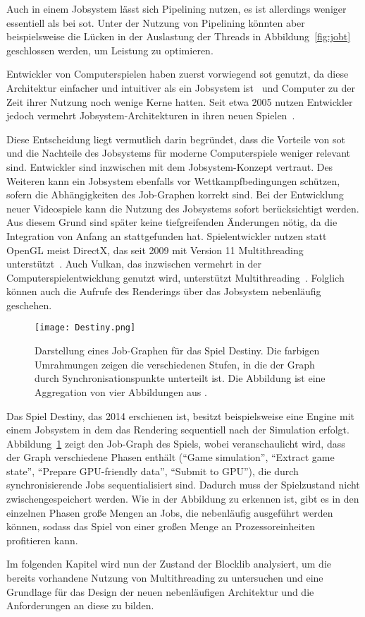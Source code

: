 Auch in einem Jobsystem lässt sich Pipelining nutzen, es ist allerdings weniger essentiell als bei \ac{sot}. Unter der Nutzung von Pipelining könnten aber beispielsweise die Lücken in der Auslastung der Threads in Abbildung~\vref{fig:jobt} geschlossen werden, um Leistung zu optimieren.

Entwickler von Computerspielen haben zuerst vorwiegend \ac{sot} genutzt, da diese Architektur einfacher und intuitiver als ein Jobsystem ist~\cite{Genova2015,Tatarchuk2014} und Computer zu der Zeit ihrer Nutzung noch wenige Kerne hatten. Seit etwa 2005 nutzen Entwickler jedoch vermehrt Jobsystem-Architekturen in ihren neuen Spielen~\cite{Davies2006,Tatarchuk2014,Genova2015,Gyrling2015,Hodgman2016}.

Diese Entscheidung liegt vermutlich darin begründet, dass die Vorteile von \ac{sot} und die Nachteile des Jobsystems für moderne Computerspiele weniger relevant sind. Entwickler sind inzwischen mit dem Jobsystem-Konzept vertraut. Des Weiteren kann ein Jobsystem ebenfalls vor Wettkampfbedingungen schützen, sofern die Abhängigkeiten des Job-Graphen korrekt sind. Bei der Entwicklung neuer Videospiele kann die Nutzung des Jobsystems sofort berücksichtigt werden. Aus diesem Grund sind später keine tiefgreifenden Änderungen nötig, da die Integration von Anfang an stattgefunden hat. Spielentwickler nutzen statt OpenGL meist DirectX, das seit 2009 mit Version 11 Multithreading unterstützt~\cite{White2018}. Auch Vulkan, das inzwischen vermehrt in der Computerspielentwicklung genutzt wird, unterstützt Multithreading~\cite{Schott2016}. Folglich können auch die Aufrufe des Renderings über das Jobsystem nebenläufig geschehen.

\begin{figure}
	\centering
	\texttt{[image: Destiny.png]}
	 \caption[Darstellung eines Job-Graphen für das Spiel Destiny.]{Darstellung eines Job-Graphen für das Spiel Destiny. Die farbigen Umrahmungen zeigen die verschiedenen Stufen, in die der Graph durch Synchronisationspunkte unterteilt ist. Die Abbildung ist eine Aggregation von vier Abbildungen aus \cite[S.~39~\psqq]{Tatarchuk2014}.}\label{fig:destiny-jobgraph}
\end{figure}

Das Spiel Destiny, das 2014 erschienen ist, besitzt beispielsweise eine Engine mit einem Jobsystem in dem das Rendering sequentiell nach der Simulation erfolgt. Abbildung~\ref{fig:destiny-jobgraph} zeigt den Job-Graph des Spiels, wobei veranschaulicht wird, dass der Graph verschiedene Phasen enthält (\enquote{Game simulation}, \enquote{Extract game state}, \enquote{Prepare GPU-friendly data}, \enquote{Submit to GPU}), die durch synchronisierende Jobs sequentialisiert sind. Dadurch muss der Spielzustand nicht zwischengespeichert werden. Wie in der Abbildung zu erkennen ist, gibt es in den einzelnen Phasen große Mengen an Jobs, die nebenläufig ausgeführt werden können, sodass das Spiel von einer großen Menge an Prozessoreinheiten profitieren kann.

Im folgenden Kapitel wird nun der Zustand der Blocklib analysiert, um die bereits vorhandene Nutzung von Multithreading zu untersuchen und eine Grundlage für das Design der neuen nebenläufigen Architektur und die Anforderungen an diese zu bilden.